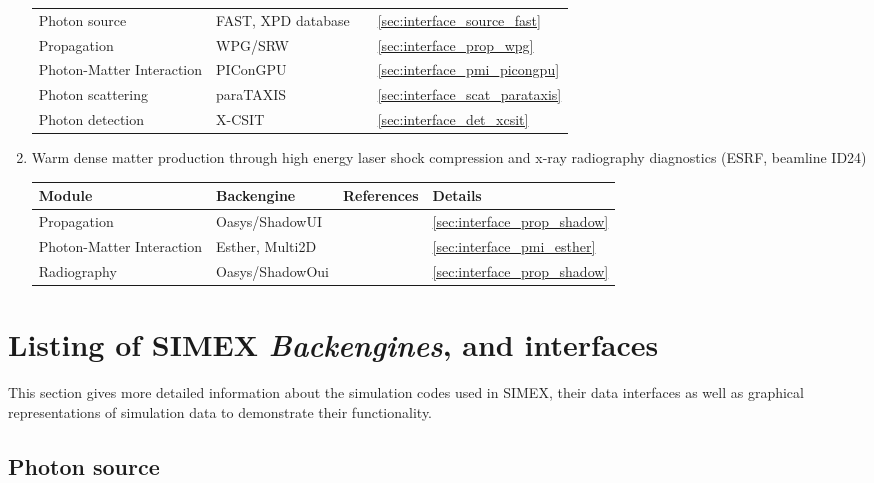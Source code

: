 \documentclass[12pt]{scrartcl}
\begin{document}
\begin{enumerate}
{\begin{tabular}{l|l|l|l}
      \hline
      Photon source &  FAST, XPD database &
      \cite{Saldin1999,xpd_xfel} & \ref{sec:interface_source_fast} \\
      Propagation &  WPG/SRW &
      \cite{Samoylova2016, wpg_github} & \ref{sec:interface_prop_wpg} \\
      Photon-Matter Interaction & PIConGPU
      & \cite{Bussmann2013} & \ref{sec:interface_pmi_picongpu} \\
      Photon scattering &  paraTAXIS & \cite{Kluge2016b} &
      \ref{sec:interface_scat_parataxis} \\
      Photon detection &  X-CSIT & \cite{Joy2015} &
      \ref{sec:interface_det_xcsit} \\
      \hline
      \hline
    \end{tabular}
  }

  \item Warm dense matter production through high energy laser shock compression
    and x-ray radiography diagnostics (ESRF, beamline ID24)\label{baseline_application_wdm}\\
    {\scriptsize%
    \begin{tabular}{l|l|l|l}
      \hline
      \hline
      \textbf{Module} & \textbf{Backengine}
      & \textbf{References} & \textbf{Details} \\
      \hline
      Propagation &  Oasys/ShadowUI &
      \cite{Rio2014} & \ref{sec:interface_prop_shadow}\\
      Photon-Matter Interaction & Esther, Multi2D
      & \cite{Colombier2005, Ramis2009} & \ref{sec:interface_pmi_esther} \\
      Radiography & Oasys/ShadowOui & \cite{Rio2014} &
      \ref{sec:interface_prop_shadow} \\
      \hline
      \hline
    \end{tabular}
  }

\end{enumerate}
%
\section{Listing of SIMEX \textit{Backengines}, and interfaces}
This section gives more detailed information about the simulation codes used in
SIMEX, their data interfaces as well as graphical representations of simulation data to demonstrate their
functionality.
\subsection{Photon source }
\end{document}
